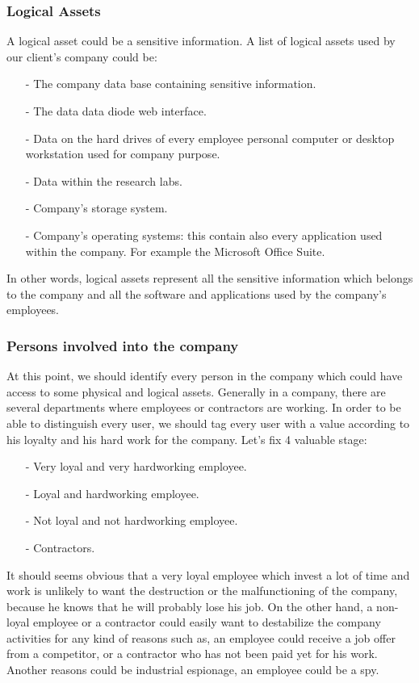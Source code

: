 \documentclass[a4paper,10pt]{article}
\begin{document}
\subsubsection{Logical Assets}
A logical asset could be a sensitive information. A list of logical assets used by our client's company could be:
\begin{enumerate}
\item[-] The company data base containing sensitive information.
\item[-] The data data diode web interface.
\item[-] Data on the hard drives of every employee personal computer or desktop workstation used for company purpose.
\item[-] Data within the research labs.
\item[-] Company's storage system.
\item[-] Company's operating systems: this contain also every application used within the company. For example the Microsoft Office Suite.
\end{enumerate}
In other words, logical assets represent all the sensitive information which belongs to the company and all the software and applications used by the company's employees.

\subsubsection{Persons involved into the company}
At this point, we should identify every person in the company which could have access to some physical and logical assets. Generally in a company, there are several departments where employees or contractors are working. In order to be able to distinguish every user, we should tag every user with a value according to his loyalty and his hard work for the company. Let's fix 4 valuable stage:
\begin{enumerate}
\item[-] Very loyal and very hardworking employee.
\item[-] Loyal and hardworking employee.
\item[-] Not loyal and not hardworking employee.
\item[-] Contractors.
\end{enumerate}
It should seems obvious that a very loyal employee which invest a lot of time and work is unlikely to want the destruction or the malfunctioning of the company, because he knows that he will probably lose his job. On the other hand, a non-loyal employee or a contractor could easily want to destabilize the company activities for any kind of reasons such as, an employee could receive a job offer from a competitor, or a contractor who has not been paid yet for his work. Another reasons could be industrial espionage, an employee could be a spy.
\end{document}
